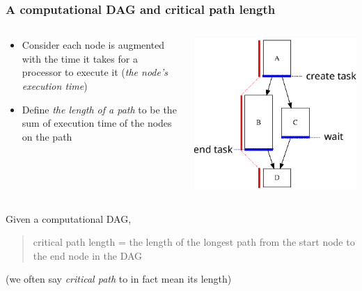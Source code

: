 \documentclass[12pt,dvipdfmx]{beamer}
\newcommand{\ao}[1]{{\color{blue}#1}}
\begin{document}
\begin{frame}[fragile]
\frametitle{A computational DAG and critical path length}
\begin{columns}[t]
\begin{column}{0.65\textwidth}
\begin{itemize}
\item Consider each node is augmented with the time
  it takes for a processor to execute it (\ao{\em the node's execution time})

\item Define {\em the length of a path} to be the
  sum of execution time of the nodes on the path
\end{itemize}

\end{column}

\begin{column}{0.35\textwidth}
\begin{center}
\includegraphics[width=\textwidth]{out/pdf/svg/dag_cp.pdf}
\end{center}
\end{column}
\end{columns}

Given a computational DAG,
\begin{quote}
\ao{critical path length 
  = the length of the longest 
  path from the start node to the end node in the DAG}
\end{quote}

(we often say {\em critical path} to in fact mean its length)
\end{frame}
\end{document}
